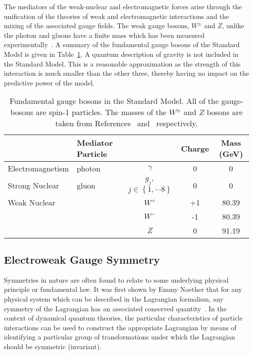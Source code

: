 The mediators of the weak-nuclear and electromagnetic forces arise through 
the unification of the theories of weak and electromagnetic interactions and the mixing
of the associated gauge fields. 
The weak gauge bosons, $W^{\pm}$ and $Z$, unlike the photon and gluons 
have a finite mass which has been measured experimentally~\citep{combinedWmass,pdg}.
A summary of the fundamental gauge bosons of the Standard Model is given in 
Table~\ref{tab:bosons}. A quantum description of gravity is not included in the Standard Model.
This is a reasonable approximation as the strength of this interaction 
is much smaller than the other three, thereby having no impact on the predictive power of the model.
\begin{table}[htbp!]
\begin{tabular}{|l|l c|c|c|}
\hline 
	& \textbf{Mediator Particle} & & \textbf{Charge} & \textbf{Mass (GeV)} \\
\hline
Electromagnetism & photon & $\gamma$ 			& 0 & 0   \\
\hline
Strong Nuclear   & gluon  & $g_{j},$ $j\in\left\{1,\cdots8\right\}$ 	& 0 & 0   \\
\hline
Weak Nuclear 	 &  &  $W^{+}$ & +1 & 80.39 \\
	 	 &  &  $W^{-}$ & -1 & 80.39 \\
	 	 &  &  $Z$     & 0  & 91.19 \\
\hline
\end{tabular}
\caption{Fundamental gauge bosons in the Standard Model.
All of the gauge-bosons are spin-1 particles.
The masses of the $W^{\pm}$ and $Z$ bosons are taken from 
References~\citep{combinedWmass} and~\citep{pdg} respectively.}
\label{tab:bosons}
\end{table}

\subsection{Electroweak Gauge Symmetry}
\label{sec:ewksymmetry}

Symmetries in nature are often found to relate to some underlying physical principle 
or fundamental law. It was first shown by Emmy Noether 
that for any physical system which can be described in the Lagrangian formalism,
any symmetry of the Lagrangian has an associated conserved quantity~\cite{noether}.
In the context of dynamical quantum theories, the particular characteristics of 
particle interactions can be used to construct the appropriate Lagrangian 
by means of identifying a particular group of transformations under which 
the Lagrangian should be symmetric (invariant). 

